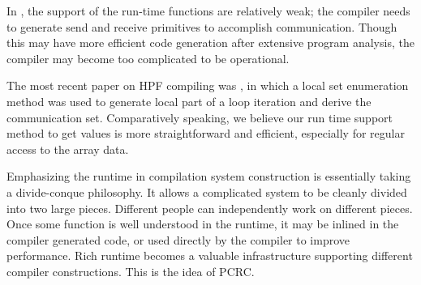 In \cite{Tes93}, the support of the run-time functions are relatively
weak; the compiler needs to generate send and receive primitives to
accomplish communication.  Though this may have more efficient code
generation after extensive program analysis, the compiler may become
too complicated to be operational.

The most recent paper on HPF compiling was \cite{Ree96}, in which a
local set enumeration method was used to generate local part of a loop
iteration and derive the communication set.
Comparatively speaking, we believe our run time support method to get
values is more straightforward and efficient, especially for
regular access to the array data.

Emphasizing the runtime in compilation system construction is
essentially taking a divide-conque philosophy.  It allows a complicated
system to be cleanly divided into two large pieces.  Different people
can independently work on different pieces.  Once some function is well
understood in the runtime, it may be inlined in the compiler generated
code, or used directly by the compiler to improve performance.  Rich
runtime becomes a valuable infrastructure supporting different compiler
constructions.  This is the idea of PCRC.

